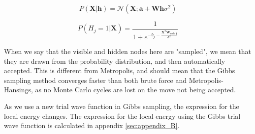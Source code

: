 \documentclass[norsk,a4paper,12pt]{article}
\begin{document}
\begin{equation}
\label{eq:gibbs_xsampling}
P(\boldsymbol{X} | \boldsymbol{h}) = \mathcal{N}(\boldsymbol{X}; \boldsymbol{a} + \boldsymbol{W} \boldsymbol{h} \sigma^2)
\end{equation}

\begin{equation}
\label{eq:gibbs_hsampling}
P(H_j = 1 | \boldsymbol{X}) = \frac{1}{ 1 + e^{- b_j - \frac{\boldsymbol{X}^T \boldsymbol{W_{cols,j}} }{\sigma^2}}}
\end{equation}

When we say that the visible and hidden nodes here are "sampled", we mean that they are drawn from the probability distribution, and then automatically accepted. This is different from Metropolis, and should mean that the Gibbs sampling method converges faster than both brute force and Metropolis-Hansings, as no Monte Carlo cycles are lost on the move not being accepted. \par 
\vspace{3mm}
As we use a new trial wave function in Gibbs sampling, the expression for the local energy changes. The expression for the local energy using the Gibbs trial wave function is calculated in appendix \ref{sec:appendix_B}.
\end{document}

